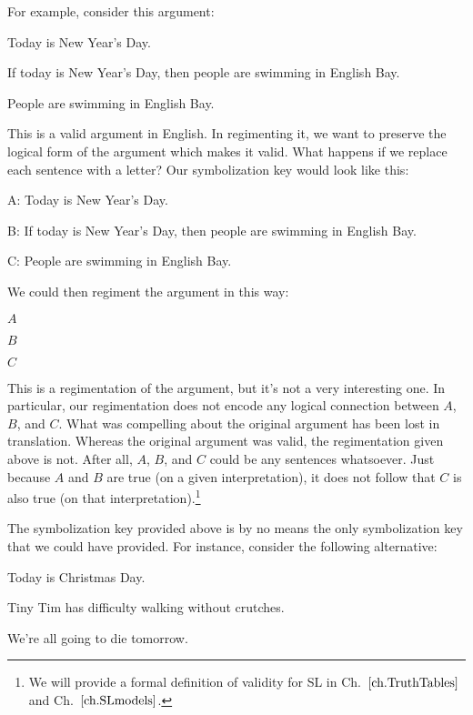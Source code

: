 For example, consider this argument:

\begin{earg}
\item[] Today is New Year's Day.
\item[] If today is New Year's Day, then people are swimming in English Bay.
\item[\therefore] People are swimming in English Bay.
\end{earg}

This is a valid argument in English.
In regimenting it, we want to preserve the logical form of the argument which makes it valid.
What happens if we replace each sentence with a letter? 
Our symbolization key would look like this:

\begin{ekey}
\item[A:]Today is New Year's Day.
\item[B:]If today is New Year's Day, then people are swimming in English Bay.
\item[C:]People are swimming in English Bay.
\end{ekey}

We could then regiment the argument in this way:

\begin{earg}
\item[] $A$
\item[] $B$
\item[\therefore] $C$
\end{earg}

This is a regimentation of the argument, but it's not a very interesting one.
In particular, our regimentation does not encode any logical connection between $A$, $B$, and $C$.
What was compelling about the original argument has been lost in translation.
Whereas the original argument was valid, the regimentation given above is not.
After all, $A$, $B$, and $C$ could be any sentences whatsoever.
Just because $A$ and $B$ are true (on a given interpretation), it does not follow that $C$ is also true (on that interpretation).\footnote{We will provide a formal definition of validity for SL in Ch.~$\ref{ch.TruthTables}$ and Ch.~$\ref{ch.SLmodels}$.}

The symbolization key provided above is by no means the only symbolization key that we could have provided.
For instance, consider the following alternative:

\begin{ekey}
\item[]Today is Christmas Day.
\item[]Tiny Tim has difficulty walking without crutches.
\item[\therefore]We're all going to die tomorrow.
\end{ekey}

